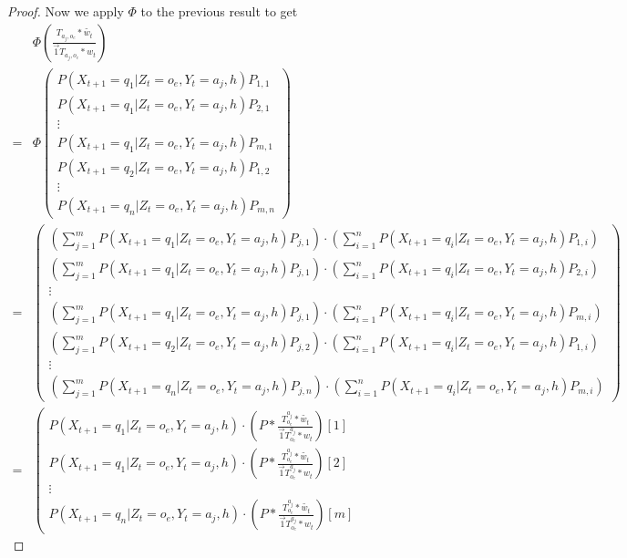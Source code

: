 \documentclass{article}
\theoremstyle{definition}
\begin{document}
\begin{proof}
Now we apply $\Phi$ to the previous result to get
\begin{align*}
&\Phi \left ( \frac{T_{a_j,o_e}*\widetilde{w_t}}{\vec{1} T_{a_j,o_e}*w_t} \right )\\
 =& \Phi \left ( \begin{matrix}
P(X_{t+1}=q_1|Z_t=o_e,Y_t=a_j,h)P_{1,1} \\
P(X_{t+1}=q_1|Z_t=o_e,Y_t=a_j,h)P_{2,1} \\
\vdots \\
P(X_{t+1}=q_1|Z_t=o_e,Y_t=a_j,h)P_{m,1} \\
P(X_{t+1}=q_2|Z_t=o_e,Y_t=a_j,h)P_{1,2} \\
\vdots \\
P(X_{t+1}=q_n|Z_t=o_e,Y_t=a_j,h)P_{m,n}
 \end{matrix} \right ) \\
 =& 
\left ( 
\begin{matrix}
\left (\sum\limits_{j=1}^m P(X_{t+1}=q_1|Z_t=o_e,Y_t=a_j,h)P_{j,1} \right ) \cdot \left ( \sum\limits_{i=1}^{n} P(X_{t+1}=q_{i}|Z_t=o_e,Y_t=a_j,h) P_{1,i} \right ) \\
\left (\sum\limits_{j=1}^m P(X_{t+1}=q_1|Z_t=o_e,Y_t=a_j,h)P_{j,1} \right ) \cdot \left ( \sum\limits_{i=1}^{n} P(X_{t+1}=q_{i}|Z_t=o_e,Y_t=a_j,h) P_{2,i} \right ) \\
\vdots \\
\left (\sum\limits_{j=1}^m P(X_{t+1}=q_1|Z_t=o_e,Y_t=a_j,h)P_{j,1} \right ) \cdot \left ( \sum\limits_{i=1}^{n} P(X_{t+1}=q_{i}|Z_t=o_e,Y_t=a_j,h) P_{m,i} \right ) \\
\left (\sum\limits_{j=1}^m P(X_{t+1}=q_2|Z_t=o_e,Y_t=a_j,h)P_{j,2} \right ) \cdot \left ( \sum\limits_{i=1}^{n} P(X_{t+1}=q_{i}|Z_t=o_e,Y_t=a_j,h) P_{1,i} \right ) \\
\vdots \\
\left (\sum\limits_{j=1}^m P(X_{t+1}=q_n|Z_t=o_e,Y_t=a_j,h)P_{j,n} \right ) \cdot \left ( \sum\limits_{i=1}^{n} P(X_{t+1}=q_{i}|Z_t=o_e,Y_t=a_j,h) P_{m,i} \right )
\end{matrix}
\right) \\
=&
\left ( 
\begin{matrix}
P(X_{t+1}=q_1|Z_t=o_e,Y_t=a_j,h)\cdot (P*\frac{T^{a_j}_{o_e}*\widetilde{w_t}}{\vec{1}T^{a_j}_{o_e}*w_t})[1] \\
P(X_{t+1}=q_1|Z_t=o_e,Y_t=a_j,h) \cdot (P*\frac{T^{a_j}_{o_e}*\widetilde{w_t}}{\vec{1}T^{a_j}_{o_e}*w_t})[2] \\
\vdots \\
P(X_{t+1}=q_n|Z_t=o_e,Y_t=a_j,h) \cdot (P*\frac{T^{a_j}_{o_e}*\widetilde{w_t}}{\vec{1}T^{a_j}_{o_e}*w_t})[m] 

\end{matrix}
\end{align*}
\end{proof}
\end{document}
